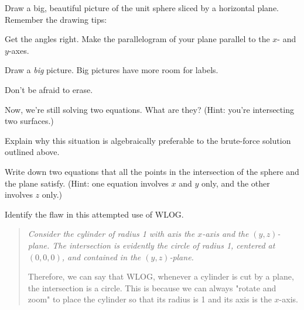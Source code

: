 \documentclass[12pt]{exam}
\theoremstyle{definition}
\begin{document}
\begin{questions}

\question Draw a big, beautiful picture of the unit sphere sliced by a horizontal plane. Remember the drawing tips:
\begin{compactitem}
    \item Get the angles right. Make the parallelogram of your plane parallel to the $x$- and $y$-axes.
    \item Draw a \emph{big} picture. Big pictures have more room for labels.
    \item Don't be afraid to erase.
\end{compactitem}

\newpage

\question Now, we're still solving two equations. What are they? (Hint: you're intersecting two surfaces.)


\question Explain why this situation is algebraically preferable to the brute-force solution outlined above.


\question Write down two equations that all the points in the intersection of the sphere and the plane satisfy. (Hint: one equation involves $x$ and $y$ only, and the other involves $z$ only.)


\question Identify the flaw in this attempted use of WLOG.

\begin{quote}
    {\em Consider the cylinder of radius 1 with axis the $x$-axis and the $(y,z)$-plane. The intersection is evidently the circle of radius 1, centered at $(0,0,0)$, and contained in the $(y,z)$-plane. 

    Therefore, we can say that WLOG, whenever a cylinder is cut by a plane, the intersection is a circle. This is because we can always "rotate and zoom" to place the cylinder so that its radius is 1 and its axis is the $x$-axis.}
\end{quote}


\end{questions} 
\end{document}
